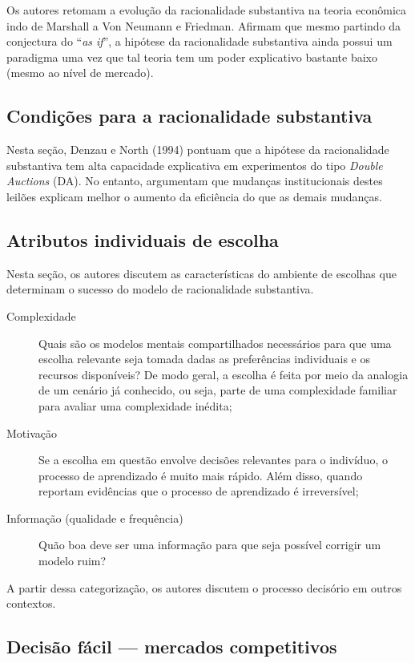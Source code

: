 \documentclass[11pt,lineno]{../style}
\newcommand{\autor}{Denzau e North (1994) }
\begin{document}
Os autores retomam a evolução da racionalidade substantiva na teoria econômica indo de Marshall a Von Neumann e Friedman. Afirmam que mesmo partindo da conjectura do ``\textit{as if}'', a hipótese da racionalidade substantiva ainda possui um paradigma uma vez que tal teoria tem um poder explicativo bastante baixo (mesmo ao nível de mercado).

\subsection{Condições para a racionalidade substantiva}

Nesta seção, \autor pontuam que a hipótese da racionalidade substantiva tem alta capacidade explicativa em experimentos do tipo \textit{Double Auctions} (DA). No entanto, argumentam que mudanças institucionais destes leilões explicam melhor o aumento da eficiência do que as demais mudanças.

\subsection{Atributos individuais de escolha}

Nesta seção, os autores discutem as características do ambiente de escolhas que determinam o sucesso do modelo de racionalidade substantiva.

\begin{description}
	\item[Complexidade] Quais são os modelos mentais compartilhados necessários para que uma escolha relevante seja tomada dadas as preferências individuais e os recursos disponíveis? De modo geral, a escolha é feita por meio da analogia de um cenário já conhecido, ou seja, parte de uma complexidade familiar para avaliar uma complexidade inédita;
	\item[Motivação] Se a escolha em questão envolve decisões relevantes para o indivíduo, o processo de aprendizado é muito mais rápido. Além disso, quando reportam evidências que o processo de aprendizado é irreversível;
	\item[Informação (qualidade e frequência)] Quão boa deve ser uma informação para que seja possível corrigir um modelo ruim?
\end{description}
A partir dessa categorização, os autores discutem o processo decisório em outros contextos.

\subsection{Decisão fácil ---  mercados competitivos}
\end{document}
